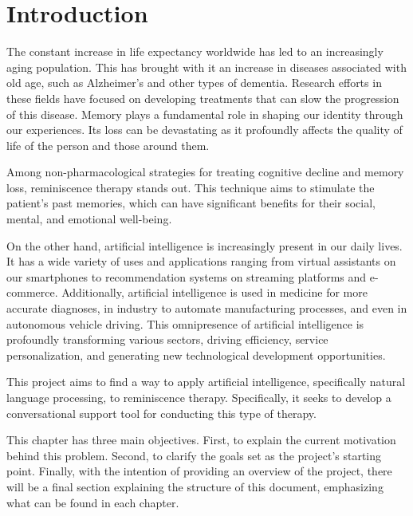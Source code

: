\chapter*{Introduction}
\label{chap:introduction}


The constant increase in life expectancy worldwide has led to an increasingly aging population. This has brought with it an increase in diseases associated with old age, such as Alzheimer's and other types of dementia. Research efforts in these fields have focused on developing treatments that can slow the progression of this disease. Memory plays a fundamental role in shaping our identity through our experiences. Its loss can be devastating as it profoundly affects the quality of life of the person and those around them.

Among non-pharmacological strategies for treating cognitive decline and memory loss, reminiscence therapy stands out. This technique aims to stimulate the patient's past memories, which can have significant benefits for their social, mental, and emotional well-being.

On the other hand, artificial intelligence is increasingly present in our daily lives. It has a wide variety of uses and applications ranging from virtual assistants on our smartphones to recommendation systems on streaming platforms and e-commerce. Additionally, artificial intelligence is used in medicine for more accurate diagnoses, in industry to automate manufacturing processes, and even in autonomous vehicle driving. This omnipresence of artificial intelligence is profoundly transforming various sectors, driving efficiency, service personalization, and generating new technological development opportunities.

This project aims to find a way to apply artificial intelligence, specifically natural language processing, to reminiscence therapy. Specifically, it seeks to develop a conversational support tool for conducting this type of therapy.

This chapter has three main objectives. First, to explain the current motivation behind this problem. Second, to clarify the goals set as the project's starting point. Finally, with the intention of providing an overview of the project, there will be a final section explaining the structure of this document, emphasizing what can be found in each chapter.

